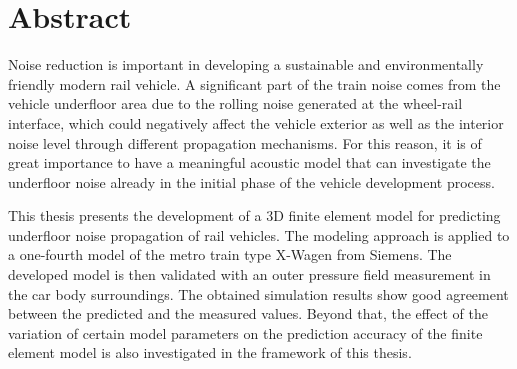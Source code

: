 \section*{Abstract}

Noise reduction is important in developing a sustainable and environmentally friendly modern rail vehicle. A significant part of the train noise comes from the vehicle underfloor area due to the rolling noise generated at the wheel-rail interface, which could negatively affect the vehicle exterior as well as the interior noise level through different propagation mechanisms. For this reason, it is of great importance to have a meaningful acoustic model that can investigate the underfloor noise already in the initial phase of the vehicle development process.

This thesis presents the development of a 3D finite element model for predicting underfloor noise propagation of rail vehicles. The modeling approach is applied to a one-fourth model of the metro train type X-Wagen from Siemens. The developed model is then validated with an outer pressure field measurement in the car body surroundings. The obtained simulation results show good agreement between the predicted and the measured values. Beyond that, the effect of the variation of certain model parameters on the prediction accuracy of the finite element model is also investigated in the framework of this thesis.